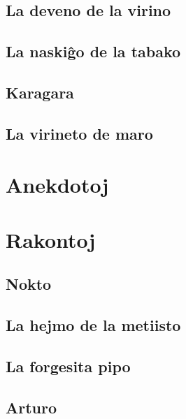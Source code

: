 \documentclass[a5paper,11pt,openany,twoside]{book}
\begin{document}
\section{La deveno de la virino}
\label{deveno}


\section{La naski\^go de la tabako}
\label{tabako}


\section{Karagara}
\label{karagara}


\section{La virineto de maro}
\label{virineto}


%
%
\chapter{Anekdotoj}
\label{anekdotoj}


%
%
\chapter{Rakontoj}
\section{Nokto}
\label{nokto}


\section{La hejmo de la metiisto}
\label{metiisto}


\section{La forgesita pipo}
\label{pipo}


\section{Arturo}
\label{arturo}

\end{document}
